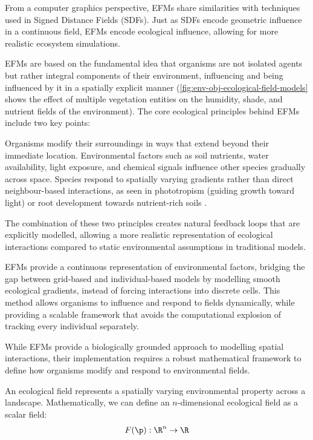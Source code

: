 From a computer graphics perspective, EFMs share similarities with techniques used in Signed Distance Fields (SDFs). Just as SDFs encode geometric influence in a continuous field, EFMs encode ecological influence, allowing for more realistic ecosystem simulations.

EFMs are based on the fundamental idea that organisms are not isolated agents but rather integral components of their environment, influencing and being influenced by it in a spatially explicit manner (\cref{fig:env-obj-ecological-field-models} shows the effect of multiple vegetation entities on the humidity, shade, and nutrient fields of the environment). The core ecological principles behind EFMs include two key points:
\begin{Itemize}
 Organisms modify their surroundings in ways that extend beyond their immediate location. Environmental factors such as soil nutrients, water availability, light exposure, and chemical signals influence other species gradually across space.
 Species respond to spatially varying gradients rather than direct neighbour-based interactions, as seen in phototropism (guiding growth toward light) \cite{Pirk2012} or root development towards nutrient-rich soils \cite{Li2023}.
\end{Itemize}

The combination of these two principles creates natural feedback loops that are explicitly modelled, allowing a more realistic representation of ecological interactions compared to static environmental assumptions in traditional models.

EFMs provide a continuous representation of environmental factors, bridging the gap between grid-based and individual-based models by modelling smooth ecological gradients, instead of forcing interactions into discrete cells. This method allows organisms to influence and respond to fields dynamically, while providing a scalable framework that avoids the computational explosion of tracking every individual separately.

While EFMs provide a biologically grounded approach to modelling spatial interactions, their implementation requires a robust mathematical framework to define how organisms modify and respond to environmental fields.





An ecological field represents a spatially varying environmental property across a landscape. Mathematically, we can define an $n$-dimensional ecological field as a scalar field:
\begin{align}
F(\p) : \R^n \to \R
\end{align}

